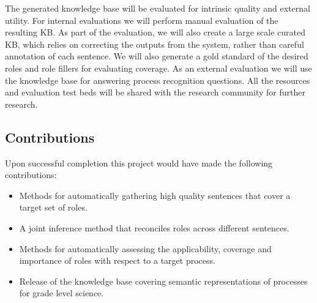 The generated knowledge base will be evaluated for intrinsic quality and external utility. For internal evaluations we will perform manual evaluation of the resulting KB. As part of the evaluation, we will also create a large scale curated KB, which relies on correcting the outputs from the system, rather than careful annotation of each sentence. We will also generate a gold standard of the desired roles and role fillers for evaluating coverage. As an external evaluation we will use the knowledge base for answering process recognition questions. All the resources and evaluation test beds will be shared with the research community for further research.
	

\subsection{Contributions}

Upon successful completion this project would have made the following contributions:
\begin{itemize}
\item Methods for automatically gathering high quality sentences that cover a target set of roles. 
\item A joint inference method that reconciles roles across different sentences.  
\item Methods for automatically assessing the applicability, coverage and importance of roles with respect to a target process.
\item Release of the knowledge base covering semantic representations of processes for grade level science.
\end{itemize}

 




